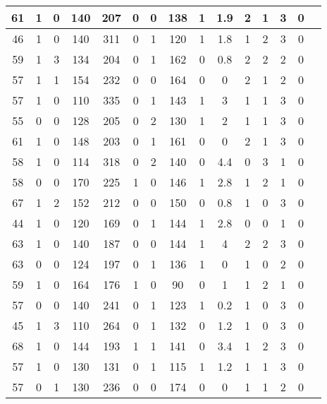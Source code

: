 \documentclass{article}
\begin{document}
\begin{longtable}{
|
c|c|c|c|c|c|c|c|c|c|c|c|c|c|c|}
\hline
61 & 1 & 0 & 140 & 207 & 0 & 0 & 138 & 1 & 1.9 & 2 & 1 & 3 & 0 \\
\hline
46 & 1 & 0 & 140 & 311 & 0 & 1 & 120 & 1 & 1.8 & 1 & 2 & 3 & 0 \\
\hline
59 & 1 & 3 & 134 & 204 & 0 & 1 & 162 & 0 & 0.8 & 2 & 2 & 2 & 0 \\
\hline
57 & 1 & 1 & 154 & 232 & 0 & 0 & 164 & 0 & 0 & 2 & 1 & 2 & 0 \\
\hline
57 & 1 & 0 & 110 & 335 & 0 & 1 & 143 & 1 & 3 & 1 & 1 & 3 & 0 \\
\hline
55 & 0 & 0 & 128 & 205 & 0 & 2 & 130 & 1 & 2 & 1 & 1 & 3 & 0 \\
\hline
61 & 1 & 0 & 148 & 203 & 0 & 1 & 161 & 0 & 0 & 2 & 1 & 3 & 0 \\
\hline
58 & 1 & 0 & 114 & 318 & 0 & 2 & 140 & 0 & 4.4 & 0 & 3 & 1 & 0 \\
\hline
58 & 0 & 0 & 170 & 225 & 1 & 0 & 146 & 1 & 2.8 & 1 & 2 & 1 & 0 \\
\hline
67 & 1 & 2 & 152 & 212 & 0 & 0 & 150 & 0 & 0.8 & 1 & 0 & 3 & 0 \\
\hline
44 & 1 & 0 & 120 & 169 & 0 & 1 & 144 & 1 & 2.8 & 0 & 0 & 1 & 0 \\
\hline
63 & 1 & 0 & 140 & 187 & 0 & 0 & 144 & 1 & 4 & 2 & 2 & 3 & 0 \\
\hline
63 & 0 & 0 & 124 & 197 & 0 & 1 & 136 & 1 & 0 & 1 & 0 & 2 & 0 \\
\hline
59 & 1 & 0 & 164 & 176 & 1 & 0 & 90 & 0 & 1 & 1 & 2 & 1 & 0 \\
\hline
57 & 0 & 0 & 140 & 241 & 0 & 1 & 123 & 1 & 0.2 & 1 & 0 & 3 & 0 \\
\hline
45 & 1 & 3 & 110 & 264 & 0 & 1 & 132 & 0 & 1.2 & 1 & 0 & 3 & 0 \\
\hline
68 & 1 & 0 & 144 & 193 & 1 & 1 & 141 & 0 & 3.4 & 1 & 2 & 3 & 0 \\
\hline
57 & 1 & 0 & 130 & 131 & 0 & 1 & 115 & 1 & 1.2 & 1 & 1 & 3 & 0 \\
\hline
57 & 0 & 1 & 130 & 236 & 0 & 0 & 174 & 0 & 0 & 1 & 1 & 2 & 0 \\
\hline
\end{longtable}
\end{document}
